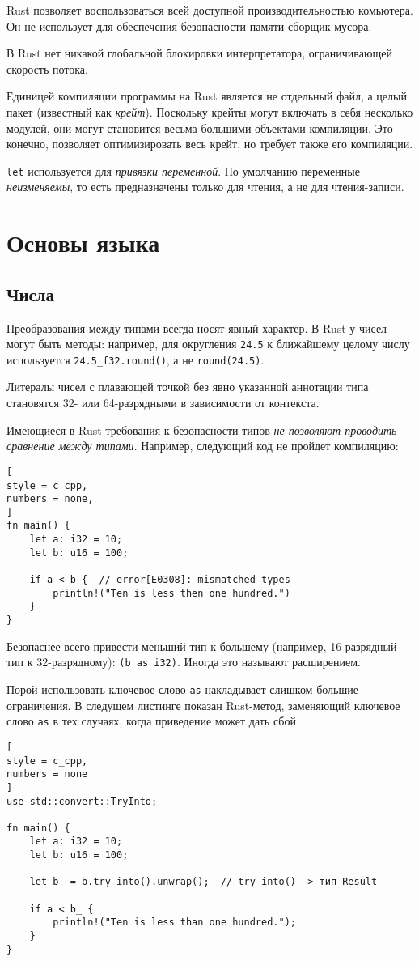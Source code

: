 \documentclass[%
	11pt,
	a4paper,
	utf8,
		]{article}
\begin{document}
Rust позволяет воспользоваться всей доступной производительностью комьютера. Он не использует для обеспечения безопасности памяти сборщик мусора.

В Rust нет никакой глобальной блокировки интерпретатора, ограничивающей скорость потока.

Единицей компиляции программы на Rust является не отдельный файл, а целый пакет (известный как \emph{крейт}). Поскольку крейты могут включать в себя несколько модулей, они могут становится весьма большими объектами компиляции. Это конечно, позволяет оптимизировать весь крейт, но требует также его компиляции.

\texttt{let} используется для \emph{привязки переменной}. По умолчанию переменные \emph{неизменяемы}, то есть предназначены только для чтения, а не для чтения-записи.

\section{Основы языка}

\subsection{Числа}

Преобразования между типами всегда носят явный характер. В Rust у чисел могут быть методы: например, для округления \texttt{24.5} к ближайшему целому числу используется \verb|24.5_f32.round()|, а не \verb|round(24.5)|.

Литералы чисел с плавающей точкой без явно указанной аннотации типа становятся 32- или 64-разрядными в зависимости от контекста.

Имеющиеся в Rust требования к безопасности типов \emph{не позволяют проводить сравнение между типами}. Например, следующий код не пройдет компиляцию:
\begin{lstlisting}[
style = c_cpp,
numbers = none,
]
fn main() {
    let a: i32 = 10;
    let b: u16 = 100;
    
    if a < b {  // error[E0308]: mismatched types
        println!("Ten is less then one hundred.")
    }
}
\end{lstlisting} 

Безопаснее всего привести меньший тип к большему (например, 16-разрядный тип к 32-разрядному): \verb|(b as i32)|. Иногда это называют расширением.

Порой использовать ключевое слово \texttt{as} накладывает слишком большие ограничения. В следущем листинге показан Rust-метод, заменяющий ключевое слово \texttt{as} в тех случаях, когда приведение может дать сбой
\begin{lstlisting}[
style = c_cpp,
numbers = none
]
use std::convert::TryInto;

fn main() {
    let a: i32 = 10;
    let b: u16 = 100;
    
    let b_ = b.try_into().unwrap();  // try_into() -> тип Result
    
    if a < b_ {
        println!("Ten is less than one hundred.");
    }
}
\end{lstlisting}
\end{document}
